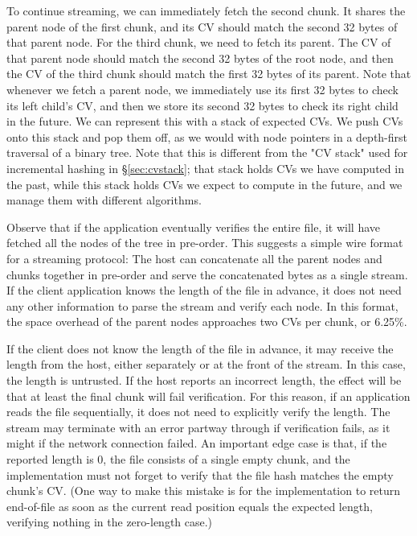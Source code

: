 \documentclass[11pt,notitlepage,a4paper]{article}
\begin{document}
To continue streaming, we can immediately fetch the second chunk. It shares the
parent node of the first chunk, and its CV should match the second 32 bytes of
that parent node. For the third chunk, we need to fetch its parent. The CV of
that parent node should match the second 32 bytes of the root node, and then
the CV of the third chunk should match the first 32 bytes of its parent. Note
that whenever we fetch a parent node, we immediately use its first 32 bytes to
check its left child's CV, and then we store its second 32 bytes to check its
right child in the future. We can represent this with a stack of expected CVs.
We push CVs onto this stack and pop them off, as we would with node pointers in
a depth-first traversal of a binary tree. Note that this is different from the
"CV stack" used for incremental hashing in \S\ref{sec:cvstack}; that stack
holds CVs we have computed in the past, while this stack holds CVs we expect to
compute in the future, and we manage them with different algorithms.

Observe that if the application eventually verifies the entire file, it will
have fetched all the nodes of the tree in pre-order. This suggests a simple
wire format for a streaming protocol: The host can concatenate all the parent
nodes and chunks together in pre-order and serve the concatenated bytes as a
single stream. If the client application knows the length of the file in
advance, it does not need any other information to parse the stream and verify
each node. In this format, the space overhead of the parent nodes approaches
two CVs per chunk, or 6.25\%.

If the client does not know the length of the file in advance, it may receive
the length from the host, either separately or at the front of the stream. In
this case, the length is untrusted. If the host reports an incorrect length,
the effect will be that at least the final chunk will fail verification. For
this reason, if an application reads the file sequentially, it does not need to
explicitly verify the length. The stream may terminate with an error partway
through if verification fails, as it might if the network connection failed. An
important edge case is that, if the reported length is 0, the file consists of
a single empty chunk, and the implementation must not forget to verify that the
file hash matches the empty chunk's CV. (One way to make this mistake is for
the implementation to return end-of-file as soon as the current read position
equals the expected length, verifying nothing in the zero-length case.)
\end{document}
